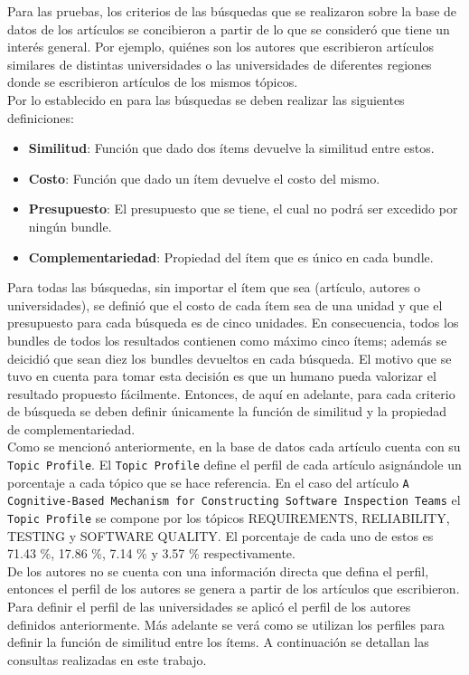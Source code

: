Para las pruebas, los criterios de las búsquedas que se realizaron sobre la base de datos de los artículos se concibieron a partir de lo que se consideró que tiene un interés general. Por ejemplo, quiénes son los autores que escribieron artículos similares de distintas universidades o las universidades de diferentes regiones donde se escribieron artículos de los mismos tópicos.\\
Por lo establecido en \cite{compositeRetrival} para las búsquedas se deben realizar las siguientes definiciones:
\begin{itemize}
  \item \textbf{Similitud}: Función que dado dos ítems devuelve la similitud entre estos.
  \item \textbf{Costo}: Función que dado un ítem devuelve el costo del mismo.
  \item \textbf{Presupuesto}: El presupuesto que se tiene, el cual no podrá ser excedido por ningún bundle.
  \item \textbf{Complementariedad}: Propiedad del ítem que es único en cada bundle.
\end{itemize}
Para todas las búsquedas, sin importar el ítem que sea (artículo, autores o universidades),  se definió que el costo de cada ítem sea de una unidad y que el presupuesto para cada búsqueda es de cinco unidades. En consecuencia, todos los bundles de todos los resultados contienen como máximo cinco ítems; además se deicidió que sean diez los bundles devueltos en cada búsqueda. El motivo que se tuvo en cuenta para tomar esta decisión es que un humano pueda valorizar el resultado propuesto fácilmente. Entonces, de aquí en adelante, para cada criterio de búsqueda se deben definir únicamente la función de similitud y la propiedad de complementariedad.\\
Como se mencionó anteriormente, en la base de datos cada artículo cuenta con su \texttt{Topic Profile}. El \texttt{Topic Profile} define el perfil de cada artículo asignándole un porcentaje a cada tópico que se hace referencia. En el caso del artículo \texttt{A Cognitive-Based Mechanism for Constructing Software Inspection Teams} el \texttt{Topic Profile} se compone por los tópicos  REQUIREMENTS, RELIABILITY, TESTING y SOFTWARE QUALITY. El porcentaje de cada uno de estos es 71.43 \%, 17.86 \%, 7.14 \% y 3.57 \% respectivamente. \\
De los autores no se cuenta con una información directa que defina el perfil, entonces el perfil de los autores se genera a partir de los artículos que escribieron. Para definir el perfil de las universidades se aplicó el perfil de los autores definidos anteriormente. Más adelante se verá como se utilizan los perfiles para definir la función de similitud entre los ítems. A continuación se detallan las consultas realizadas en este trabajo.\\
